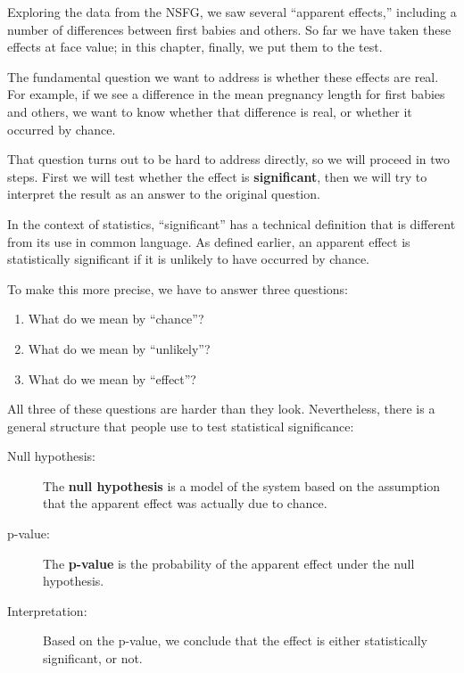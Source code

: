 \documentclass[12pt]{book}
\begin{document}
Exploring the data from the NSFG, we saw several ``apparent effects,''
including a number of differences between first babies and others.
So far we have taken these effects at face value; in this chapter,
finally, we put them to the test.


The fundamental question we want to address is whether these effects
are real.  For example, if we see a difference in the mean pregnancy
length for first babies and others, we want to know whether that
difference is real, or whether it occurred by chance.


That question turns out to be hard to address directly, so we will
proceed in two steps.  First we will test whether the effect is {\bf
  significant}, then we will try to interpret the result
  as an answer to the original question.


In the context of statistics, ``significant'' has a technical
definition that is different from its use in common language.
As defined earlier, an apparent effect is statistically
significant if it is unlikely to have occurred by chance.


To make this more precise, we have to answer three questions:

\begin{enumerate}

\item What do we mean by ``chance''?

\item What do we mean by ``unlikely''?

\item What do we mean by ``effect''?

\end{enumerate}

All three of these questions are harder than they look.  Nevertheless,
there is a general structure that people use to test statistical
significance:

\begin{description}

\item[Null hypothesis:] The {\bf null hypothesis} is a model of the
  system based on the assumption that the apparent effect was actually
  due to chance.


\item[p-value:] The {\bf p-value} is the probability of the apparent
  effect under the null hypothesis.


\item[Interpretation:] Based on the p-value, we conclude that the
  effect is either statistically significant, or not.

\end{description}
\end{document}
